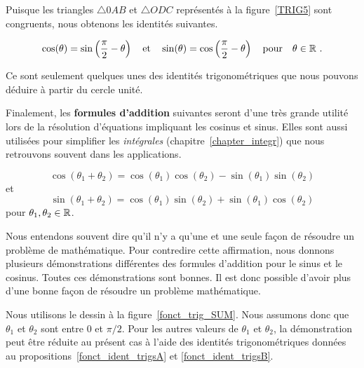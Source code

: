 {Puisque les triangles $\triangle 0AB$ et $\triangle ODC$ représentés à la
figure~\ref{TRIG5} sont congruents, nous obtenons les identités
suivantes.

\begin{focus}{\prp}
\[
\cos(\theta) = \sin\left(\frac{\pi}{2} - \theta\right)
\quad \text{et} \quad
\sin(\theta) = \cos\left(\frac{\pi}{2} - \theta\right)
\quad \text{pour} \quad \theta \in \mathbb{R} \ .
\]
\label{fonct_ident_trigsB}
\end{focus}

Ce sont seulement quelques unes des identités trigonométriques que
nous pouvons déduire à partir du cercle unité.



Finalement, les {\bfseries formules d'addition}
suivantes seront d'une très grande utilité lors de la résolution
d'équations impliquant les cosinus et sinus.  Elles sont aussi
utilisées pour simplifier les {\em intégrales}
(chapitre~\ref{chapter_integr}) que nous retrouvons souvent dans les
applications.

\begin{focus}{\prp}
\[
\cos(\theta_1 + \theta_2) = \cos(\theta_1)\cos(\theta_2)
- \sin(\theta_1)\sin(\theta_2)
\]
et
\[
\sin(\theta_1 + \theta_2) = \cos(\theta_1)\sin(\theta_2) +
\sin(\theta_1)\cos(\theta_2)
\]
pour $\theta_1, \theta_2 \in \mathbb{R}$.
\end{focus}

\begin{rmk}[\theory]
Nous entendons souvent dire qu'il n'y a qu'une et une seule façon de
résoudre un problème de mathématique.  Pour contredire cette
affirmation, nous donnons plusieurs démonstrations différentes des
formules d'addition pour le sinus et le cosinus. Toutes ces
démonstrations sont bonnes.  Il est donc possible d'avoir plus d'une
bonne façon de résoudre un problème mathématique.

Nous utilisons le dessin à la figure~\ref{fonct_trig_SUM}.  Nous
assumons donc que $\theta_1$ et $\theta_2$ sont entre $0$ et $\pi/2$.
Pour les autres valeurs de $\theta_1$ et $\theta_2$, la démonstration
peut être réduite au présent cas à l'aide des identités
trigonométriques données
au propositions~\ref{fonct_ident_trigsA} et \ref{fonct_ident_trigsB}.


\end{rmk}}
